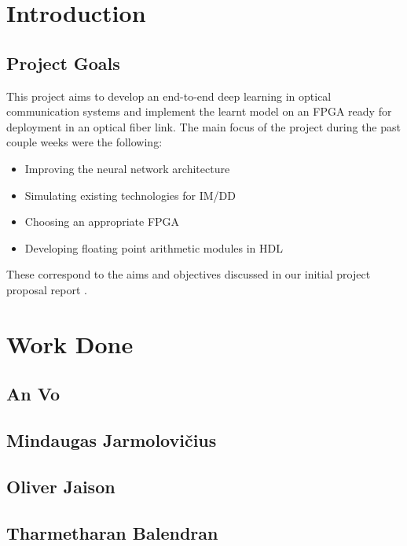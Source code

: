 \documentclass[a4paper,12pt]{article}
\begin{document}
        
	\section{Introduction}
	    \subsection{Project Goals}
	    
	    This project aims to develop an end-to-end deep learning in optical communication systems and implement the learnt model on an FPGA ready for deployment in an optical fiber link. The main focus of the project during the past couple weeks were the following:
	    
	    \begin{itemize}
            \item Improving the neural network architecture
            \item Simulating existing technologies for IM/DD
            \item Choosing an appropriate FPGA
            \item Developing floating point arithmetic modules in HDL
        \end{itemize}
        
	    These correspond to the aims and objectives discussed in our initial project proposal report \autocite{proposal_report}. 
	    
	\section{Work Done}
    	\subsection{An Vo}
    	
    	
    	\subsection{Mindaugas Jarmolovi\v{c}ius}
    	
    	
    	\subsection{Oliver Jaison}
    	
    	
    	\subsection{Tharmetharan Balendran}
    	
	
\end{document}
